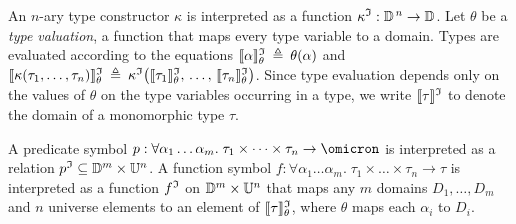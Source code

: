 An $n$-ary type constructor $\kappa$ is interpreted as a function
$\kappa^{\mathfrak{I}} : \mathbb{D}^{\,n} \to \mathbb{D}$.
Let $\theta$ be a {\em type valuation}, a function that maps every
type variable to a domain. Types are evaluated according to the
equations
$\llbracket\alpha\rrbracket^{\mathfrak{I}}_{\theta} \:\triangleq\: \theta(\alpha)$
and
$\llbracket\kappa(\tau_1,\dots,\tau_n)\rrbracket^{\mathfrak{I}}_{\theta} \:\triangleq\: \kappa^{\mathfrak{I}}\bigl(\llbracket\tau_1\rrbracket^{\mathfrak{I}}_{\theta},\,\dots,\,\llbracket\tau_n\rrbracket^{\mathfrak{I}}_{\theta}\bigr)$.
%
Since type evaluation depends only on the values of $\theta$
on the type variables occurring in a type, we write $\llbracket\tau\rrbracket^{\mathfrak{I}}$
to denote the domain of a monomorphic type $\tau$.

A predicate symbol $p : \forall \alpha_1\dots\alpha_m .\; \tau_1 \times \dots \times \tau_n
\to \omicron$ is interpreted as a relation
$\smash{p^{\mathfrak{I}}} \subseteq \mathbb{D}^m \times \mathbb{U}^n$.
A function symbol $f : \forall \alpha_1\dots\alpha_m .\; \tau_1 \times \dots \times \tau_n \to \tau$
is interpreted as a function
$f^{\mathfrak{I}}$ on $\mathbb{D}^m \times \mathbb{U}^n$ that
maps any $m$ domains $D_1,\dots,D_m$ and
$n$ universe elements to an element of
$\llbracket\tau\rrbracket^{\mathfrak{I}}_\theta$, where $\theta$ maps each $\alpha_i$ to $D_i$.

